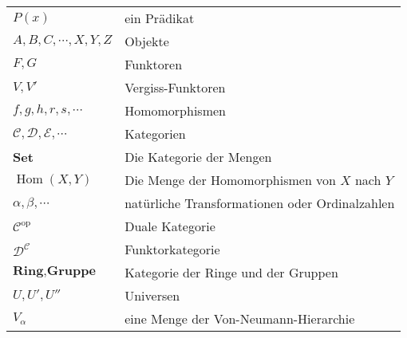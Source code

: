 \documentclass[a4paper]{amsart}
\theoremstyle{definition}
\DeclareMathOperator{\Hom}{Hom}
\newcommand{\CC}{\ensuremath{\mathcal{ C }}}
\newcommand{\DD}{\ensuremath{\mathcal{ D }}}
\begin{document}
\renewcommand*{\arraystretch}{1}

\begin{tabular}{ll}
    $P(x)$                              & ein Prädikat\\
    $A, B, C, \cdots, X, Y, Z$          & Objekte\\
    $F,G$                               & Funktoren\\
    $V, V'$                             & Vergiss-Funktoren\\
    $f, g, h, r, s, \cdots$             & Homomorphismen\\
    $\mathcal C, \mathcal D, \mathcal E, \cdots$ & Kategorien\\
    \textbf{Set}                        & Die Kategorie der Mengen\\
    $\Hom( X, Y)$                       & Die Menge der Homomorphismen von $X$ nach $Y$\\
    $\alpha, \beta, \cdots$             & natürliche Transformationen oder Ordinalzahlen\\
    $\mathcal C ^{\text{op}}$           & Duale Kategorie\\
    $\DD^\CC$                           & Funktorkategorie\\
    $\textbf{Ring}, \textbf{Gruppe}$    & Kategorie der Ringe und der Gruppen\\
    $U, U', U''$                        & Universen\\
    $V_\alpha$                          & eine Menge der Von-Neumann-Hierarchie

\end{tabular}
\end{document}
